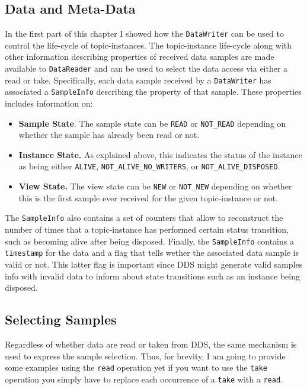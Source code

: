 \subsection{Data and Meta-Data}  
In the first part of this chapter I showed how the \texttt{DataWriter} 
can be used to control the life-cycle of  topic-instances.  
The topic-instance life-cycle along with other information describing properties 
of received data samples are made available to \texttt{DataReader} and can be used 
to select the data access via either a read or take. 
Specifically, each data sample received by a \texttt{DataWriter} has
associated a \texttt{SampleInfo} describing the property of 
that sample. These properties includes information on:
\begin{itemize}
	\item \textbf{Sample State}. The sample state can be \texttt{READ} 
	or \texttt{NOT\_READ} depending on whether the sample has already 
	been read or not. 

	\item \textbf{Instance State.} As explained above, this indicates the 
	status of the instance as being either \texttt{ALIVE}, 
	\texttt{NOT\_ALIVE\_NO\_WRITERS}, or \texttt{NOT\_ALI\-VE\_DISPOSED}.
	
	\item \textbf{View State.} The view state can be \texttt{NEW} or 
	\texttt{NOT\_NEW} depending on whether this is the first sample 
	ever received for the given topic-instance or not.
\end{itemize}
The \texttt{SampleInfo} also contains a set of counters that allow to 
reconstruct the number of times that a topic-instance has performed 
certain status transition, such as becoming alive after being disposed. 
Finally, the \texttt{SampleInfo} contains a \texttt{timestamp} for the 
data and a flag that tells wether the associated data sample is valid or not.  
This latter flag is important since DDS might generate valid samples info 
with invalid data to inform about state transitions such as an instance 
being disposed.

\subsection{Selecting Samples}  
Regardless of whether data are read or taken from \ac{DDS}, the same 
mechanism is used to express the sample selection. Thus, for brevity, 
I am going to provide some examples using the \texttt{read} operation
yet if you want to use the \texttt{take} operation you simply have to 
replace each occurrence of a \texttt{take} with a \texttt{read}. 

